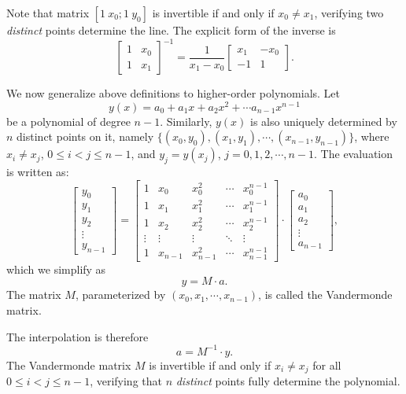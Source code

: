 Note that matrix $[ 1\ x_0; 1\ y_0]$ is invertible if and only if $x_0 \neq x_1$, verifying
two \emph{distinct} points determine the line. The explicit form of the inverse is
\[
\begin{bmatrix} 1 & x_0 \\ 1 & x_1 \end{bmatrix}^{-1}
=
\frac{1}{x_1 - x_0}
\begin{bmatrix} x_1 & -x_0 \\ -1 & 1 \end{bmatrix}.
\]

We now generalize above definitions to higher-order polynomials.
Let 
\[ y(x) = a_0 + a_1 x + a_2 x^2 + \cdots a_{n-1} x^{n-1}\] %
be a polynomial of degree $n-1$.
Similarly, $y(x)$ is also uniquely determined by $n$ distinct points on it, namely
$\{(x_0,y_0), (x_1, y_1), \cdots, (x_{n-1}, y_{n-1})\}$, where $x_i \neq x_j$, $0 \le i < j \le n-1$,
and $y_j = y(x_j)$, $j = 0, 1, 2, \cdots, n-1$.
The evaluation is written as:
\[
\begin{bmatrix} y_0 \\ y_1 \\ y_2 \\ \vdots \\ y_{n-1} \end{bmatrix}
=
\begin{bmatrix}
1 & x_0 & x_0^2 & \cdots & x_0^{n-1} \\
1 & x_1 & x_1^2 & \cdots & x_1^{n-1} \\
1 & x_2 & x_2^2 & \cdots & x_2^{n-1} \\
\vdots & \vdots & \vdots & \ddots & \vdots \\
1 & x_{n-1} & x_{n-1}^2 & \cdots & x_{n-1}^{n-1}
\end{bmatrix}
\cdot
\begin{bmatrix} a_0 \\ a_1 \\ a_2 \\ \vdots \\ a_{n-1} \end{bmatrix},
\]
which we simplify as
\[ y = M \cdot a.  \]
The matrix $M$, parameterized by $(x_0, x_1, \cdots, x_{n-1})$, is called the Vandermonde matrix.

The interpolation is therefore
\[ a = M^{-1} \cdot y.  \]
The Vandermonde matrix $M$ is invertible if and only if $x_i \neq x_j$ for all $0 \le i < j \le n-1$, 
verifying that $n$ \emph{distinct} points fully determine the polynomial.

